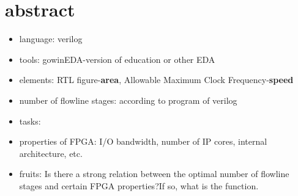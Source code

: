 \documentclass{article}
\begin{document}
\section{abstract}
\begin{itemize}
    \item language: verilog
    \item tools: gowinEDA-version of education or other EDA
    \item elements: RTL figure-\textbf{area}, Allowable Maximum Clock Frequency-\textbf{speed}
    \item number of flowline stages: according to program of verilog
    \item tasks: 
    \item properties of FPGA: I/O bandwidth, number of IP cores, internal architecture, etc.
    \item fruits: Is there a strong relation between the optimal number of flowline stages and certain FPGA properties?If so, what is the function.
\end{itemize}
\end{document}
